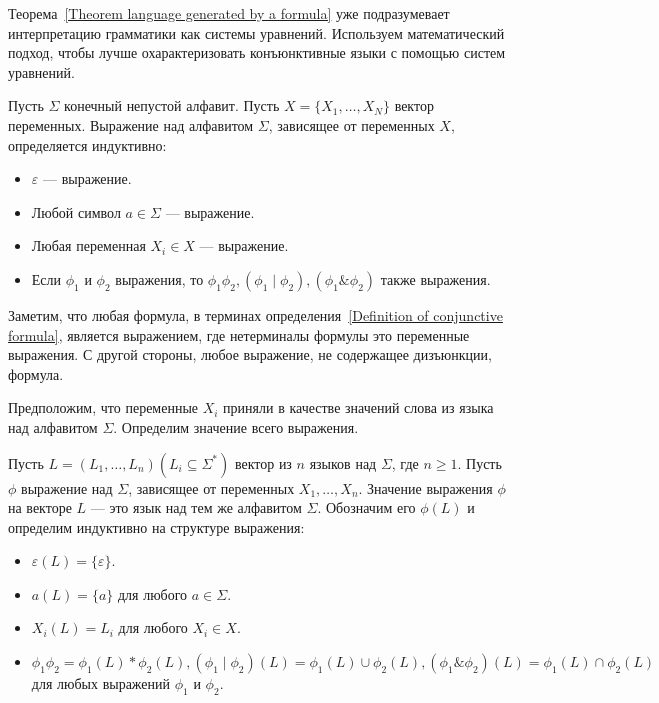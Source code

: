 Теорема~\ref{Theorem language generated by a formula} уже подразумевает интерпретацию грамматики как системы уравнений. Используем математический подход, чтобы лучше охарактеризовать конъюнктивные языки с помощью систем уравнений.

\begin{definition}[Выражение]
    Пусть $\Sigma$ конечный непустой алфавит. Пусть $X = \{X_1,\ldots,X_N\}$ вектор переменных. Выражение над алфавитом $\Sigma$, зависящее от переменных $X$, определяется индуктивно:
    \begin{itemize}
       \item $\varepsilon$ --- выражение.
       \item Любой символ $a\in\Sigma$ --- выражение.
       \item Любая переменная $X_i\in X$ --- выражение.
       \item Если $\phi_1$ и $\phi_2$ выражения, то $\phi_1\phi_2, (\phi_1\mid\phi_2), (\phi_1\&\phi_2)$ также выражения.
    \end{itemize}
    Заметим, что любая формула, в терминах определения~\ref{Definition of conjunctive formula}, является выражением, где нетерминалы формулы это переменные выражения. С другой стороны, любое выражение, не содержащее дизъюнкции, формула.
\end{definition}

Предположим, что переменные $X_i$ приняли в качестве значений слова из языка над алфавитом $\Sigma$. Определим значение всего выражения.

\begin{definition}\label{Value of conjunctive expression}
    Пусть $L = (L_1,\ldots,L_n) (L_i \subseteq \Sigma^*)$ вектор из $n$ языков над $\Sigma$, где $n \geqslant 1$. Пусть $\phi$ выражение над $\Sigma$, зависящее от переменных $X_1,\ldots,X_n$. Значение выражения $\phi$ на векторе $L$ --- это язык над тем же алфавитом $\Sigma$. Обозначим его $\phi(L)$ и определим индуктивно на структуре выражения:
    \begin{itemize}
       \item $\varepsilon(L) = \{\varepsilon\}$.
       \item $a(L) = \{a\}$ для любого $a\in\Sigma$.
       \item $X_i(L) = L_i$ для любого $X_i \in X$.
       \item $\phi_1\phi_2 = \phi_1(L) * \phi_2(L), (\phi_1\mid\phi_2)(L) = \phi_1(L) \cup \phi_2(L), (\phi_1\&\phi_2)(L) = \phi_1(L) \cap \phi_2(L)$ для любых выражений $\phi_1$ и $\phi_2$.
    \end{itemize}
\end{definition}

